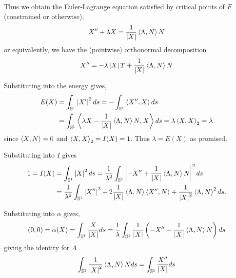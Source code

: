 \documentclass[12pt]{article}
\begin{document}
Thus we obtain the Euler-Lagrange equation satisfied by critical points of \(F\) (constrained or otherwise),
\begin{equation}
\label{eq:el}
X'' + \lambda X = \frac{1}{\left|{X}\right|} \left\langle{\Lambda},{N}\right\rangle N
\end{equation}
or equivalently, we have the (pointwise) orthonormal decomposition
\begin{equation}
\label{eq:pointwise_orth}
X'' = -\lambda \left|{X}\right| T + \frac{1}{\left|{X}\right|} \left\langle{\Lambda},{N}\right\rangle N
\end{equation}

Substituting into the energy gives,
\begin{equation}
\label{eq:Ecrit}
\begin{split}
E(X) &= \int_{\operatorname{\mathbb{S}^1}} \left|{X'}\right|^2 ds = -\int_{\operatorname{\mathbb{S}^1}} \left\langle{X''},{X}\right\rangle ds \\
&= \int_{\operatorname{\mathbb{S}^1}} \left\langle{\lambda X - \frac{1}{\left|{X}\right|} \ensuremath{\left\langle{\Lambda},{N}\right\rangle}N},{X}\right\rangle ds = \lambda \left\langle{X},{X}\right\rangle_2 = \lambda
\end{split}
\end{equation}
since \(\left\langle{X},{N}\right\rangle = 0\) and \(\left\langle{X},{X}\right\rangle_2 = I(X) = 1\). Thus \(\lambda = E(X)\) as promised.

Substituting into \(I\) gives
\begin{equation}
\label{eq:Icrit}
\begin{split}
1 = I(X) &= \int_{\operatorname{\mathbb{S}^1}} \left|{X}\right|^2 ds = \frac{1}{\lambda^2} \int_{\operatorname{\mathbb{S}^1}} \left|{-X'' +  \frac{1}{\left|{X}\right|} \left\langle{\Lambda},{N}\right\rangle N}\right|^2 ds \\
&= \frac{1}{\lambda^2} \int_{\operatorname{\mathbb{S}^1}} \left|{X''}\right|^2 - 2\frac{1}{\left|{X}\right|} \left\langle{\Lambda},{N}\right\rangle\left\langle{X''},{N}\right\rangle + \frac{1}{\left|{X}\right|^2} \left\langle{\Lambda},{N}\right\rangle^2 ds.
\end{split}
\end{equation}

Substituting into \(\alpha\) gives,
\[
(0, 0) = \alpha(X) = \int_{\operatorname{\mathbb{S}^1}} \frac{X}{\left|{X}\right|} ds = \frac{1}{\lambda} \int_{\operatorname{\mathbb{S}^1}} \frac{1}{\left|{X}\right|} \left(-X'' + \frac{1}{\left|{X}\right|} \left\langle{\Lambda},{N}\right\rangle N\right) ds
\]
giving the identity for \(\Lambda\)
\begin{equation}
\label{eq:vecidentity_lambda}
\int_{\operatorname{\mathbb{S}^1}} \frac{1}{\left|{X}\right|^2} \left\langle{\Lambda},{N}\right\rangle N ds = \int_{\operatorname{\mathbb{S}^1}} \frac{X''}{\left|{X}\right|} ds
\end{equation}
\end{document}
